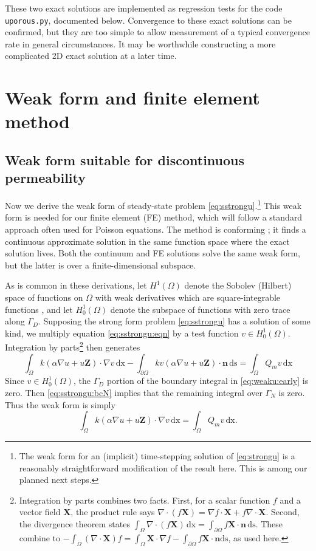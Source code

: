 \documentclass[11pt]{amsart}
\newcommand{\bn}{\mathbf{n}}
\newcommand{\bX}{\mathbf{X}}
\newcommand{\bZ}{\mathbf{Z}}
\newcommand{\dx}{\mathrm{dx}}
\newcommand{\ds}{\mathrm{ds}}
\newcommand{\Div}{\nabla\cdot}
\newcommand{\grad}{\nabla}
\begin{document}
These two exact solutions are implemented as regression tests for the code \texttt{uporous.py}, documented below.  Convergence to these exact solutions can be confirmed, but they are too simple to allow measurement of a typical convergence rate in general circumstances.  It may be worthwhile constructing a more complicated 2D exact solution at a later time.


\section{Weak form and finite element method}

\subsection{Weak form suitable for discontinuous permeability}  Now we derive the weak form of steady-state problem \eqref{eq:sstrongu}.\footnote{The weak form for an (implicit) time-stepping solution of \eqref{eq:strongu} is a reasonably straightforward modification of the result here.  This is among our planned next steps.}  This weak form is needed for our finite element (FE) method, which will follow a standard approach often used for Poisson equations.  The method is conforming \citep{Elman2014}; it finds a continuous approximate solution in the same function space where the exact solution lives.  Both the continuum and FE solutions solve the same weak form, but the latter is over a finite-dimensional subspace.

As is common in these derivations, let $H^1(\Omega)$ denote the Sobolev (Hilbert) space of functions on $\Omega$ with weak derivatives which are square-integrable functions \citep[chapter 5]{Evans2010}, and let $H_0^1(\Omega)$ denote the subspace of functions with zero trace along $\Gamma_D$.  Supposing the strong form problem \eqref{eq:sstrongu} has a solution of some kind, we multiply equation \eqref{eq:sstrongu:eqn} by a test function $v \in H_0^1(\Omega)$.  Integration by parts\footnote{Integration by parts combines two facts.  First, for a scalar function $f$ and a vector field $\bX$, the product rule says $\Div(f\bX) = \grad f \cdot \bX + f \Div \bX$.  Second, the divergence theorem states $\int_\Omega \Div (f\bX)\,\dx = \int_{\partial \Omega} f\bX\cdot \bn\,\ds$.  These combine to $-\int_\Omega (\Div \bX) f = \int_\Omega \bX \cdot \grad f - \int_{\partial\Omega} f \bX\cdot\bn\ds$, as used here.} then generates
\begin{equation}
\int_\Omega k \left(\alpha\grad u + u\bZ\right) \cdot \grad v\,\dx - \int_{\partial\Omega} k v \left(\alpha\grad u + u\bZ\right) \cdot \bn\,\ds = \int_\Omega Q_m v\,\dx \label{eq:weaku:early}
\end{equation}
Since $v\in H_0^1(\Omega)$, the $\Gamma_D$ portion of the boundary integral in \eqref{eq:weaku:early} is zero.  Then \eqref{eq:sstrongu:bcN} implies that the remaining integral over $\Gamma_N$ is zero.  Thus the weak form is simply
\begin{equation}
\int_\Omega k \left(\alpha\grad u + u\bZ\right) \cdot \grad v\,\dx = \int_\Omega Q_m v\,\dx. \label{eq:weaku}
\end{equation}
\end{document}
